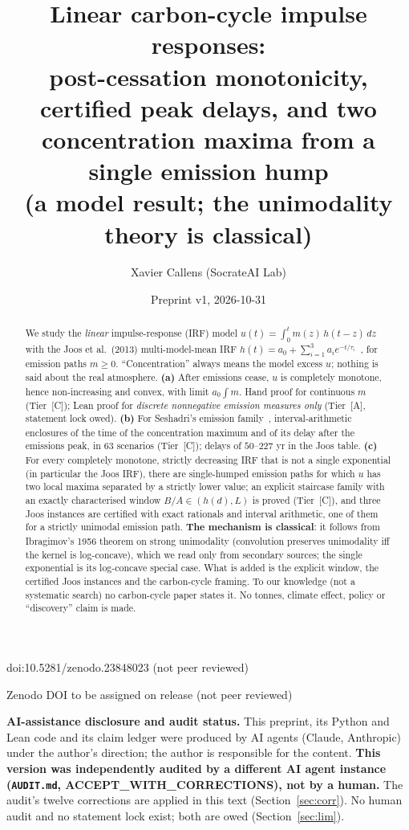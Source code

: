 \documentclass[10pt]{article}
\title{Linear carbon-cycle impulse responses:\\
post-cessation monotonicity, certified peak delays, and two concentration maxima from a single emission hump\\
{\large (a model result; the unimodality theory is classical)}}
\author{Xavier Callens (SocrateAI Lab)}
\date{Preprint v1, 2026-10-31}
\newcommand{\tier}[1]{\textsf{[#1]}}
\newcommand{\tA}{\tier{A}}
\newcommand{\tC}{\tier{C}}
\theoremstyle{plain}
\begin{document}
\maketitle
\begin{center}\small doi:10.5281/zenodo.23848023 \quad (not peer reviewed)\end{center}

\begin{center}\small Zenodo DOI to be assigned on release \quad (not peer reviewed)\end{center}

\noindent\textbf{AI-assistance disclosure and audit status.} This preprint, its Python and Lean code and its claim ledger were
produced by AI agents (Claude, Anthropic) under the author's direction; the author is responsible for the content.
\textbf{This version was independently audited by a different AI agent instance (\texttt{AUDIT.md}, ACCEPT\_WITH\_CORRECTIONS), not by a human.}
The audit's twelve corrections are applied in this text (Section~\ref{sec:corr}). No human audit and no statement lock exist; both are owed (Section~\ref{sec:lim}).

\begin{abstract}
We study the \emph{linear} impulse-response (IRF) model $u(t)=\int_0^t m(z)\,h(t-z)\,dz$ with the Joos et al.\ (2013) multi-model-mean IRF
$h(t)=a_0+\sum_{i=1}^3 a_i e^{-t/\tau_i}$~\cite{joos}, for emission paths $m\ge0$. ``Concentration'' always means the model excess $u$; nothing is said about the real atmosphere.
\textbf{(a)} After emissions cease, $u$ is completely monotone, hence non-increasing and convex, with limit $a_0\int m$. Hand proof for continuous $m$ (Tier~\tC{}); Lean proof for \emph{discrete nonnegative emission measures only} (Tier~\tA{}, statement lock owed).
\textbf{(b)} For Seshadri's emission family~\cite{sesh}, interval-arithmetic enclosures of the time of the concentration maximum and of its delay after the emissions peak, in $63$ scenarios (Tier~\tC{}); delays of $50$--$227$ yr in the Joos table.
\textbf{(c)} For every completely monotone, strictly decreasing IRF that is not a single exponential (in particular the Joos IRF), there are single-humped emission paths for which $u$ has two local maxima separated by a strictly lower value; an explicit staircase family with an exactly characterised window $B/A\in(h(d),L)$ is proved (Tier~\tC{}), and three Joos instances are certified with exact rationals and interval arithmetic, one of them for a strictly unimodal emission path.
\textbf{The mechanism is classical}: it follows from Ibragimov's 1956 theorem on strong unimodality (convolution preserves unimodality iff the kernel is log-concave), which we read only from secondary sources; the single exponential is its log-concave special case. What is added is the explicit window, the certified Joos instances and the carbon-cycle framing. To our knowledge (not a systematic search) no carbon-cycle paper states it. No tonnes, climate effect, policy or ``discovery'' claim is made.
\end{abstract}
\end{document}
